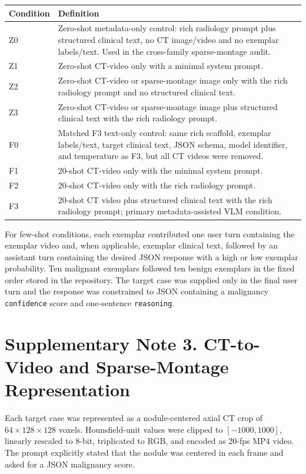\documentclass[11pt]{article}
\begin{document}
\begin{center}
\small
{}
\begin{tabularx}{0.95\linewidth}{@{}lY@{}}
\toprule
Condition & Definition \\
\midrule
Z0 & Zero-shot metadata-only control: rich radiology prompt plus structured
clinical text, no CT image/video and no exemplar labels/text. Used in the
cross-family sparse-montage audit. \\
Z1 & Zero-shot CT-video only with a minimal system prompt. \\
Z2 & Zero-shot CT-video or sparse-montage image only with the rich radiology
prompt and no structured clinical text. \\
Z3 & Zero-shot CT-video or sparse-montage image plus structured clinical text
with the rich radiology prompt. \\
F0 & Matched F3 text-only control: same rich scaffold, exemplar labels/text,
target clinical text, JSON schema, model identifier, and temperature as F3,
but all CT videos were removed. \\
F1 & 20-shot CT-video only with the minimal system prompt. \\
F2 & 20-shot CT-video only with the rich radiology prompt. \\
F3 & 20-shot CT video plus structured clinical text with the rich radiology
prompt; primary metadata-assisted VLM condition. \\
\bottomrule
\end{tabularx}
\end{center}

For few-shot conditions, each exemplar contributed one user turn containing the
exemplar video and, when applicable, exemplar clinical text, followed by an
assistant turn containing the desired JSON response with a high or low exemplar
probability. Ten malignant exemplars followed ten benign exemplars in the fixed
order stored in the repository. The target case was supplied only in the final
user turn and the response was constrained to JSON containing a malignancy
\texttt{confidence} score and one-sentence \texttt{reasoning}.

\section*{Supplementary Note 3. CT-to-Video and Sparse-Montage Representation}

Each target case was represented as a nodule-centered axial CT crop of
$64\times128\times128$ voxels. Hounsfield-unit values were clipped to
$[-1000,1000]$, linearly rescaled to 8-bit, triplicated to RGB, and encoded as
20-fps MP4 video. The prompt explicitly stated that the nodule was centered in
each frame and asked for a JSON malignancy score.
\end{document}
